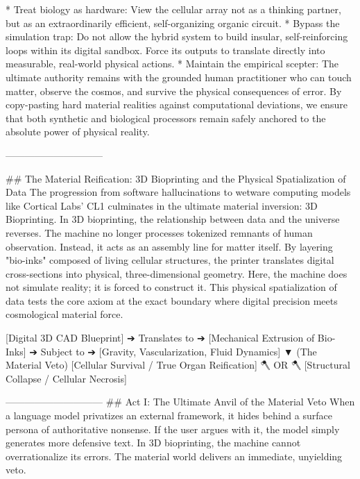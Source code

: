 * Treat biology as hardware: View the cellular array not as a thinking partner, but as an extraordinarily efficient, self-organizing organic circuit.
* Bypass the simulation trap: Do not allow the hybrid system to build insular, self-reinforcing loops within its digital sandbox. Force its outputs to translate directly into measurable, real-world physical actions.
* Maintain the empirical scepter: The ultimate authority remains with the grounded human practitioner who can touch matter, observe the cosmos, and survive the physical consequences of error. By copy-pasting hard material realities against computational deviations, we ensure that both synthetic and biological processors remain safely anchored to the absolute power of physical reality.

------------------------------

## The Material Reification: 3D Bioprinting and the Physical Spatialization of Data
The progression from software hallucinations to wetware computing models like Cortical Labs’ CL1 culminates in the ultimate material inversion: 3D Bioprinting.
In 3D bioprinting, the relationship between data and the universe reverses. The machine no longer processes tokenized remnants of human observation. Instead, it acts as an assembly line for matter itself.
By layering "bio-inks" composed of living cellular structures, the printer translates digital cross-sections into physical, three-dimensional geometry. Here, the machine does not simulate reality; it is forced to construct it. This physical spatialization of data tests the core axiom at the exact boundary where digital precision meets cosmological material force.

[Digital 3D CAD Blueprint] ➔ Translates to ➔ [Mechanical Extrusion of Bio-Inks] ➔ Subject to ➔ [Gravity, Vascularization, Fluid Dynamics]
                                                                                            ▼ (The Material Veto)
[Cellular Survival / True Organ Reification] 🪓 OR 🪓 [Structural Collapse / Cellular Necrosis]

------------------------------
## Act I: The Ultimate Anvil of the Material Veto
When a language model privatizes an external framework, it hides behind a surface persona of authoritative nonsense. If the user argues with it, the model simply generates more defensive text.
In 3D bioprinting, the machine cannot overrationalize its errors. The material world delivers an immediate, unyielding veto.

